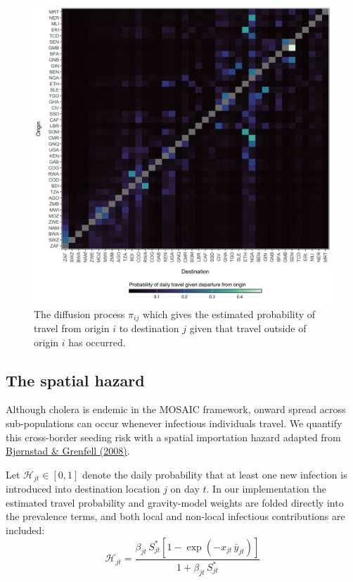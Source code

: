 \documentclass[
]{book}
\begin{document}
\begin{figure}

{\centering \includegraphics[width=1\linewidth]{figures/mobility_diffusion_pi} 

}

\caption{The diffusion process $\pi_{ij}$ which gives the estimated probability of travel from origin $i$ to destination $j$ given that travel outside of origin $i$ has occurred.}\label{fig:mobility-diffusion}
\end{figure}

\subsection{The spatial hazard}\label{the-spatial-hazard}

Although cholera is endemic in the MOSAIC framework, onward spread across sub-populations can occur whenever infectious individuals travel. We quantify this cross-border seeding risk with a spatial importation hazard adapted from \href{http://link.springer.com/10.1007/s10651-007-0059-3}{Bjørnstad \& Grenfell (2008)}.

Let \(\mathcal{H}_{jt}\in[0,1]\) denote the daily probability that at least one new infection is introduced into destination location \(j\) on day \(t\). In our implementation the estimated travel probability and gravity-model weights are folded directly into the prevalence terms, and both local and non-local infectious contributions are included:
\begin{equation}
\mathcal{H}_{jt} =
\frac{\displaystyle
  \beta_{jt}\,S^{*}_{jt}
  \left[1-\exp\left(-x_{jt}\,\bar y_{jt}\right)\right]}
     {\displaystyle 1+\beta_{jt}\,S^{*}_{jt}}
\label{eq:spatial-hazard}
\end{equation}
\end{document}
